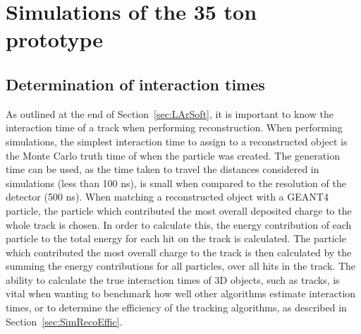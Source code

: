 \newcommand{\BigO}[1]{\ensuremath{\operatorname{O}\bigl(#1\bigr)}}


\chapter{Simulations of the 35 ton prototype} \label{chap:35tonSim} %

\graphicspath{ {35tonSimulation/Figs/Raster/} {35tonSimulation/Figs/PDF/} {35tonSimulation/Figs/Vector/} }

\section{Determination of interaction times} \label{sec:SimInteractionTimes} %
As outlined at the end of Section~\ref{sec:LArSoft}, it is important to know the interaction time of a track when performing reconstruction. When performing simulations, the simplest interaction time to assign to a reconstructed object is the Monte Carlo truth time of when the particle was created. The generation time can be used, as the time taken to travel the distances considered in simulations (less than 100 ns), is small when compared to the resolution of the detector (500 ns). When matching a reconstructed object with a GEANT4 particle, the particle which contributed the most overall deposited charge to the whole track is chosen. In order to calculate this, the energy contribution of each particle to the total energy for each hit on the track is calculated. The particle which contributed the most overall charge to the track is then calculated by the summing the energy contributions for all particles, over all hits in the track. The ability to calculate the true interaction times of 3D objects, such as tracks, is vital when wanting to benchmark how well other algorithms estimate interaction times, or to determine the efficiency of the tracking algorithms, as described in Section~\ref{sec:SimRecoEffic}. \\


